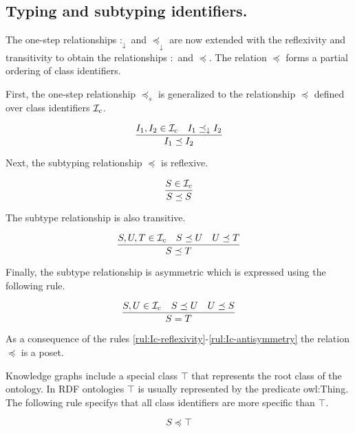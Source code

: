 \documentclass[runningheads]{llncs}
\newcommand{\darr}{\downarrow}
\newcommand{\Ic}{{\cal I}_c}
\newcommand{\nl}{\hfill\break}
\begin{document}
\subsection{Typing and subtyping identifiers.}\nl

The one-step relationships $:_\darr$ and $\preceq_\darr$ are now
extended with the reflexivity and transitivity to obtain the
relationships $:$ and $\preceq$. The relation $\preceq$ forms a
partial ordering of class
identifiers. %

First, the one-step relationship $\preceq_s$ is generalized to the
relationship $\preceq$ defined over class identifiers $\Ic$.

\begin{equation}
\label{rul:Ic-extended}
\dfrac{I_1,I_2\in\Ic \quad I_1\preceq_\darr I_2}
      {I_1 \preceq I_2}
\end{equation}

Next, the subtyping relationship $\preceq$ is reflexive.

\begin{equation}
\label{rul:Ic-reflexivity}
\dfrac{S\in \Ic}
      {S\preceq\/S}
\end{equation}

The subtype relationship is also transitive. 

\begin{equation}
\label{rul:Ic-transitivity}
\dfrac{S,U,T\in\Ic \quad S\preceq\/U \quad U\preceq\/T}
      {S\preceq\/T}   
\end{equation}

Finally, the subtype relationship is asymmetric which is expressed
using the following rule. 

\begin{equation}
\label{rul:Ic-antisymmetry}
\dfrac{S,U\in\Ic \quad S\preceq\/U \quad U\preceq\/S}
      {S=T}   
\end{equation}

As a consequence of the rules
\ref{rul:Ic-reflexivity}-\ref{rul:Ic-antisymmetry} the relation
$\preceq$ is a poset.

Knowledge graphs include a special class $\top$ that represents the
root class of the ontology. In RDF ontologies $\top$ is usually
represented by the predicate owl:Thing. The following rule specifys
that all class identifiers are more specific than $\top$.

\begin{equation}
S\preceq\top
\end{equation}
\end{document}
